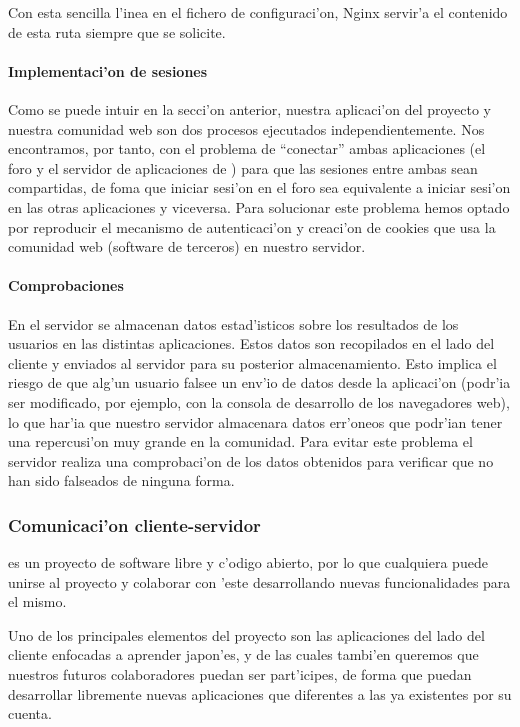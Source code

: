Con esta sencilla l'inea en el fichero de configuraci'on, Nginx servir'a el contenido de esta ruta siempre que se solicite.

\paragraph{Implementaci'on de sesiones}


Como se puede intuir en la secci'on anterior, nuestra aplicaci'on del proyecto y nuestra comunidad web son dos procesos ejecutados independientemente.
Nos encontramos, por tanto, con el problema de ``conectar'' ambas aplicaciones (el foro y el servidor de aplicaciones de \Nipponline{}) para que las
sesiones entre ambas sean compartidas, de foma que iniciar sesi'on en el foro sea equivalente a iniciar sesi'on en las otras aplicaciones y viceversa.
Para solucionar este problema hemos optado por reproducir el mecanismo de autenticaci'on y creaci'on de cookies que usa la comunidad web (software de terceros)
en nuestro servidor.

\paragraph{Comprobaciones}


En el servidor se almacenan datos estad'isticos sobre los resultados de los usuarios en las distintas aplicaciones. Estos datos son recopilados en el lado
del cliente y enviados al servidor para su posterior almacenamiento. Esto implica el riesgo de que alg'un usuario falsee un env'io de datos desde la aplicaci'on
(podr'ia ser modificado, por ejemplo, con la consola de desarrollo de los navegadores web), lo que har'ia que nuestro servidor almacenara datos err'oneos que
podr'ian tener una repercusi'on muy grande en la comunidad. Para evitar este problema el servidor realiza una comprobaci'on de los datos obtenidos para
verificar que no han sido falseados de ninguna forma.

\subsubsection{Comunicaci'on cliente-servidor}
\label{sub:comunicacion_cliente_servidor}

\Nipponline{} es un proyecto de software libre y c'odigo abierto, por lo que cualquiera puede unirse al proyecto y
colaborar con 'este desarrollando nuevas funcionalidades para el mismo.

Uno de los principales elementos del proyecto son las aplicaciones del lado del cliente enfocadas a aprender
japon'es, y de las cuales tambi'en queremos que nuestros futuros colaboradores puedan ser part'icipes, de forma que
puedan desarrollar libremente nuevas aplicaciones que diferentes a las ya existentes por su cuenta.

